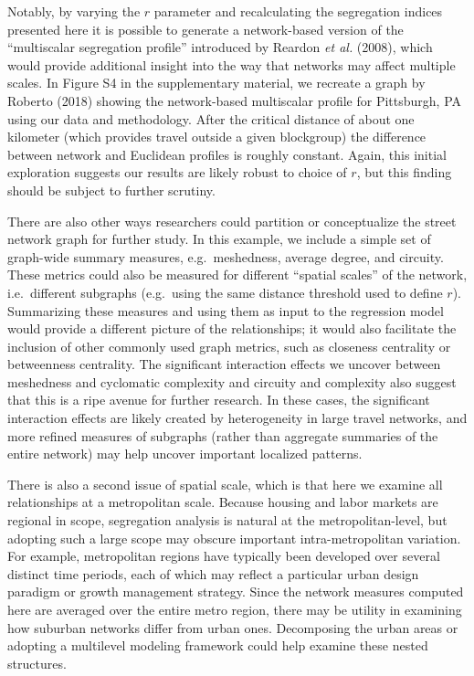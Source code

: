 \documentclass[
  10pt,
]{article}
\begin{document}
Notably, by varying the \(r\) parameter and recalculating the
segregation indices presented here it is possible to generate a
network-based version of the ``multiscalar segregation profile''
introduced by Reardon \emph{et al.} (2008), which would provide
additional insight into the way that networks may affect multiple
scales. In Figure S4 in the supplementary material, we recreate a graph
by Roberto (2018) showing the network-based multiscalar profile for
Pittsburgh, PA using our data and methodology. After the critical
distance of about one kilometer (which provides travel outside a given
blockgroup) the difference between network and Euclidean profiles is
roughly constant. Again, this initial exploration suggests our results
are likely robust to choice of \(r\), but this finding should be subject
to further scrutiny.

There are also other ways researchers could partition or conceptualize
the street network graph for further study. In this example, we include
a simple set of graph-wide summary measures, e.g.~meshedness, average
degree, and circuity. These metrics could also be measured for different
``spatial scales'' of the network, i.e.~different subgraphs (e.g.~using
the same distance threshold used to define \(r\)). Summarizing these
measures and using them as input to the regression model would provide a
different picture of the relationships; it would also facilitate the
inclusion of other commonly used graph metrics, such as closeness
centrality or betweenness centrality. The significant interaction
effects we uncover between meshedness and cyclomatic complexity and
circuity and complexity also suggest that this is a ripe avenue for
further research. In these cases, the significant interaction effects
are likely created by heterogeneity in large travel networks, and more
refined measures of subgraphs (rather than aggregate summaries of the
entire network) may help uncover important localized patterns.

There is also a second issue of spatial scale, which is that here we
examine all relationships at a metropolitan scale. Because housing and
labor markets are regional in scope, segregation analysis is natural at
the metropolitan-level, but adopting such a large scope may obscure
important intra-metropolitan variation. For example, metropolitan
regions have typically been developed over several distinct time
periods, each of which may reflect a particular urban design paradigm or
growth management strategy. Since the network measures computed here are
averaged over the entire metro region, there may be utility in examining
how suburban networks differ from urban ones. Decomposing the urban
areas or adopting a multilevel modeling framework could help examine
these nested structures.
\end{document}

